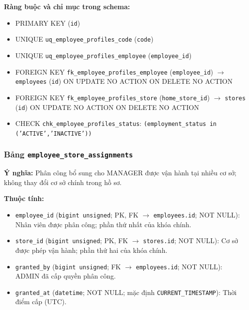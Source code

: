 \textbf{Ràng buộc và chỉ mục trong schema:}

\begin{itemize}

\item PRIMARY KEY (\texttt{id})

\item UNIQUE \texttt{uq\_employee\_profiles\_code} (\texttt{code})

\item UNIQUE \texttt{uq\_employee\_profiles\_employee} (\texttt{employee\_id})

\item FOREIGN KEY \texttt{fk\_employee\_profiles\_employee} (\texttt{employee\_id}) $\rightarrow$ \texttt{employees} (\texttt{id}) ON UPDATE NO ACTION ON DELETE NO ACTION

\item FOREIGN KEY \texttt{fk\_employee\_profiles\_store} (\texttt{home\_store\_id}) $\rightarrow$ \texttt{stores} (\texttt{id}) ON UPDATE NO ACTION ON DELETE NO ACTION

\item CHECK \texttt{chk\_employee\_profiles\_status}: \texttt{(employment\_status in ('ACTIVE','INACTIVE'))}

\end{itemize}

\subsubsection{Bảng \texttt{employee\_store\_assignments}}

\textbf{Ý nghĩa:} Phân công bổ sung cho MANAGER được vận hành tại nhiều cơ sở; không thay đổi cơ sở chính trong hồ sơ.\par

\textbf{Thuộc tính:}

\begin{itemize}

\item \texttt{employee\_id} (\texttt{bigint unsigned}; PK, FK $\rightarrow$ \texttt{employees.id}; NOT NULL): Nhân viên được phân công; phần thứ nhất của khóa chính.

\item \texttt{store\_id} (\texttt{bigint unsigned}; PK, FK $\rightarrow$ \texttt{stores.id}; NOT NULL): Cơ sở được phép vận hành; phần thứ hai của khóa chính.

\item \texttt{granted\_by} (\texttt{bigint unsigned}; FK $\rightarrow$ \texttt{employees.id}; NOT NULL): ADMIN đã cấp quyền phân công.

\item \texttt{granted\_at} (\texttt{datetime}; NOT NULL; mặc định \texttt{CURRENT\_TIMESTAMP}): Thời điểm cấp (UTC).

\end{itemize}

